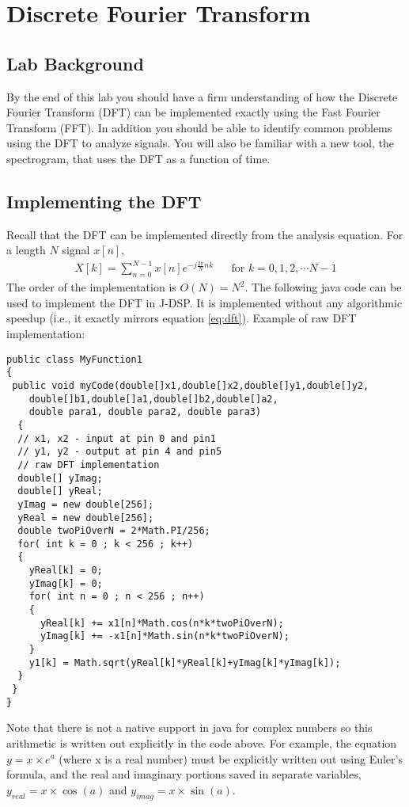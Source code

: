 
\section{Discrete Fourier Transform}

\subsection{Lab Background}
By the end of this lab you should have a firm understanding of how the
Discrete Fourier Transform (DFT) can be implemented exactly using the
Fast Fourier Transform (FFT). In addition you should be able to
identify common problems using the DFT to analyze signals. You will
also be familiar with a new tool, the spectrogram, that uses the DFT
as a function of time.

\subsection{Implementing the DFT}

Recall that the DFT can be implemented directly from the analysis
equation. For a length $N$ signal $x[n]$,
\begin{align}
X[k]=\sum_{n=0}^{N-1}x[n]e^{-j \frac{2\pi}{N} nk} && \text{for $k = 0, 1, 2, \cdots N-1$}
\label{eq:dft}
\end{align}
The order of the implementation is $O(N)=N^2$. The following java code
can be used to implement the DFT in J-DSP. It is implemented without
any algorithmic speedup (i.e., it exactly mirrors equation
\ref{eq:dft}).  Example of raw DFT implementation:
	\begin{lstlisting}
public class MyFunction1
{
 public void myCode(double[]x1,double[]x2,double[]y1,double[]y2,
 	double[]b1,double[]a1,double[]b2,double[]a2,
 	double para1, double para2, double para3)
  {
  // x1, x2 - input at pin 0 and pin1
  // y1, y2 - output at pin 4 and pin5
  // raw DFT implementation
  double[] yImag;
  double[] yReal;
  yImag = new double[256];
  yReal = new double[256];
  double twoPiOverN = 2*Math.PI/256;
  for( int k = 0 ; k < 256 ; k++)
  {
    yReal[k] = 0;
    yImag[k] = 0;
    for( int n = 0 ; n < 256 ; n++)
    {
      yReal[k] += x1[n]*Math.cos(n*k*twoPiOverN);
      yImag[k] += -x1[n]*Math.sin(n*k*twoPiOverN);
    }
    y1[k] = Math.sqrt(yReal[k]*yReal[k]+yImag[k]*yImag[k]);
  }
 }
}
	\end{lstlisting}
Note that there is not a native support in java for complex numbers so
this arithmetic is written out explicitly in the code above. For
example, the equation $y=x\times e^{a}$ (where x is a real number)
must be explicitly written out using Euler's formula, and the real and
imaginary portions saved in separate variables, $y_{real}=x\times
\cos(a)$ and $y_{imag}=x\times \sin(a)$.

